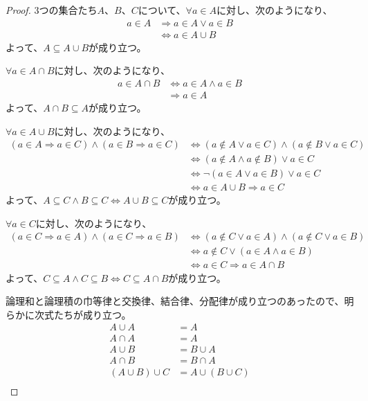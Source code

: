 \documentclass[a4paper]{jsarticle}
\begin{document}
\begin{proof}
3つの集合たち$A$、$B$、$C$について、$\forall a \in A$に対し、次のようになり、
\begin{align*}
a \in A &\Rightarrow a \in A \vee a \in B\\
&\Leftrightarrow a \in A \cup B 
\end{align*}
よって、$A \subseteq A \cup B$が成り立つ。\par
$\forall a \in A \cap B$に対し、次のようになり、
\begin{align*}
a \in A \cap B &\Leftrightarrow a \in A \land a \in B\\
&\Rightarrow a \in A
\end{align*}
よって、$A \cap B \subseteq A$が成り立つ。\par
$\forall a \in A \cup B$に対し、次のようになり、
\begin{align*}
(a \in A \Rightarrow a \in C) \land (a \in B \Rightarrow a \in C) &\Leftrightarrow (a \notin A \vee a \in C) \land (a \notin B \vee a \in C)\\
&\Leftrightarrow (a \notin A \land a \notin B) \vee a \in C\\
&\Leftrightarrow \neg(a \in A \vee a \in B) \vee a \in C\\
&\Leftrightarrow a \in A \cup B \Rightarrow a \in C
\end{align*}
よって、$A \subseteq C \land B \subseteq C \Leftrightarrow A \cup B \subseteq C$が成り立つ。\par
$\forall a \in C$に対し、次のようになり、
\begin{align*}
(a \in C \Rightarrow a \in A) \land (a \in C \Rightarrow a \in B) &\Leftrightarrow (a \notin C \vee a \in A) \land (a \notin C \vee a \in B)\\
&\Leftrightarrow a \notin C \vee (a \in A \land a \in B)\\
&\Leftrightarrow a \in C \Rightarrow a \in A \cap B
\end{align*}
よって、$C \subseteq A \land C \subseteq B \Leftrightarrow C \subseteq A \cap B$が成り立つ。\par
論理和と論理積の巾等律と交換律、結合律、分配律が成り立つのあったので、明らかに次式たちが成り立つ。
\begin{align*}
A \cup A &= A\\
A \cap A &= A\\
A \cup B &= B \cup A\\
A \cap B &= B \cap A\\
(A \cup B) \cup C &= A \cup (B \cup C)\\

\end{align*}
\end{proof}
\end{document}
